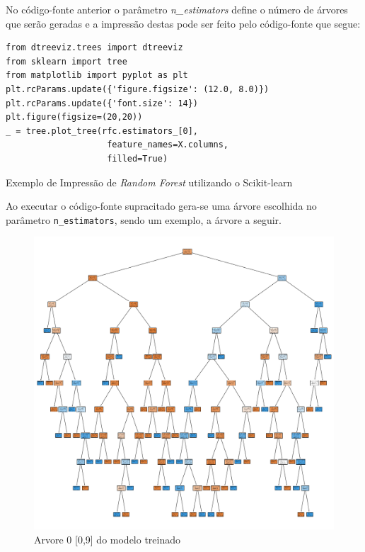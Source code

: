 \documentclass[12pt]{article}
\begin{document}
No código-fonte anterior o parâmetro \textit{n\_estimators} define o número de árvores que serão geradas e a impressão destas pode ser feito pelo código-fonte que segue:

\begin{listing}[H]
\begin{verbatim}
from dtreeviz.trees import dtreeviz
from sklearn import tree
from matplotlib import pyplot as plt
plt.rcParams.update({'figure.figsize': (12.0, 8.0)})
plt.rcParams.update({'font.size': 14})
plt.figure(figsize=(20,20))
_ = tree.plot_tree(rfc.estimators_[0], 
                    feature_names=X.columns,
                    filled=True)
\end{verbatim}
\caption{Exemplo de Impressão de \emph{Random Forest} utilizando o Scikit-learn}
\end{listing}

Ao executar o código-fonte supracitado gera-se uma árvore escolhida no parâmetro \texttt{n\_estimators}, sendo um exemplo, a árvore a seguir. 

\begin{figure}[H]
\centering
\includegraphics[width=1\textwidth]{tree_0.png}
\caption{Arvore 0 [0,9] do modelo treinado}
\label{Tree}
\end{figure}



\end{document}
